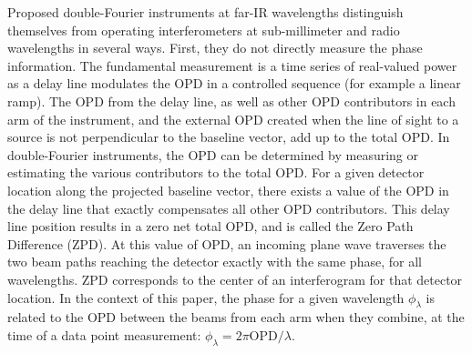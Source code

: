 Proposed double-Fourier instruments at far-IR wavelengths distinguish themselves from operating interferometers at sub-millimeter and radio wavelengths in several ways. First, they do not directly measure the phase information. The fundamental measurement is a time series of real-valued power as a delay line modulates the OPD in a controlled sequence (for example a linear ramp). The OPD from the delay line, as well as other OPD contributors in each arm of the instrument, and the external OPD created when the line of sight to a source is not perpendicular to the baseline vector, add up to the total OPD.
In double-Fourier instruments, the OPD can be determined by measuring or estimating the various contributors to the total OPD. For a given detector location along the projected baseline vector, there exists a value of the OPD in the delay line that exactly compensates all other OPD contributors. This delay line position results in a zero net total OPD, and is called the Zero Path Difference (ZPD). At this value of OPD, an incoming plane wave traverses the two beam paths reaching the detector exactly with the same phase, for all wavelengths. ZPD corresponds to the center of an interferogram for that detector location. In the
context of this paper, the phase for a given wavelength $
\phi_\lambda$ is related to the OPD between the beams from each arm when they combine, at the time of a data point measurement: $\phi_\lambda = 2\pi\textrm{OPD}/ \lambda$.



